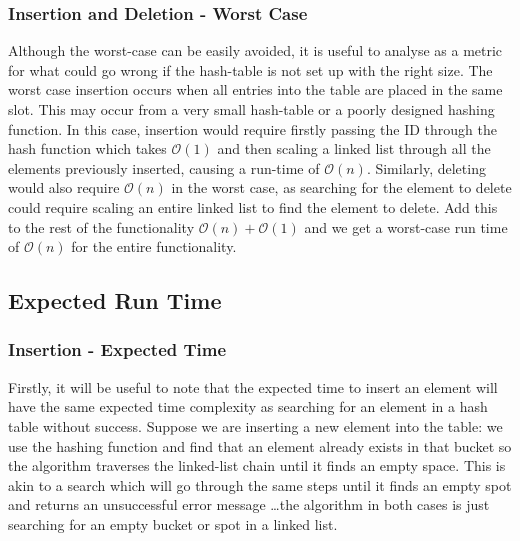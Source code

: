 \documentclass[11p]{article}
\def\nl{\newline}
\begin{document}
\pagebreak
\subsubsection{Insertion and Deletion - Worst Case}
Although the worst-case can be easily avoided, it is useful to analyse as a metric for what could go wrong if the hash-table is not set up with the right size. The worst case insertion occurs when all entries into the table are placed in the same slot. This may occur from a very small hash-table or a poorly designed hashing function. In this case, insertion would require firstly passing the ID through the hash function which takes $\mathcal{O}(1)$ and then scaling a linked list through all the elements previously inserted, causing a run-time of $\mathcal{O}(n)$. \nl
Similarly, deleting would also require $\mathcal{O}(n)$ in the worst case, as searching for the element to delete could require scaling an entire linked list to find the element to delete. Add this to the rest of the functionality $\mathcal{O}(n) + \mathcal{O}(1)$ and we get a worst-case run time of $\mathcal{O}(n)$ for the entire functionality.

\subsection{Expected Run Time}
\subsubsection{Insertion - Expected Time}
Firstly, it will be useful to note that the expected time to insert an element will have the same expected time complexity as searching for an element in a hash table without success. Suppose we are inserting a new element into the table: we use the hashing function and find that an element already exists in that bucket so the algorithm traverses the linked-list chain until it finds an empty space. This is akin to a search which will go through the same steps until it finds an empty spot and returns an unsuccessful error message \dots the algorithm in both cases is just searching for an empty bucket or spot in a linked list. \nl
\end{document}
